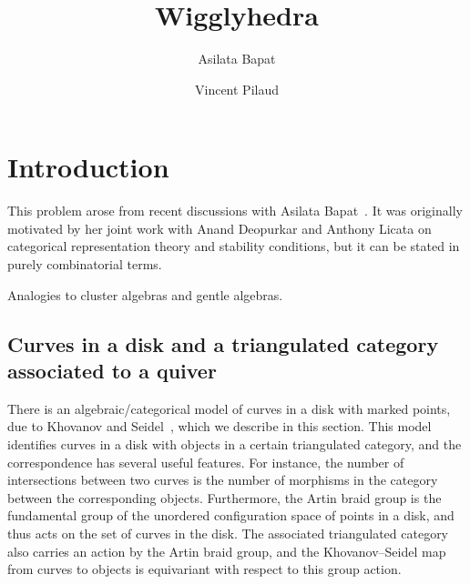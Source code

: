 \documentclass{amsart}
\title{Wigglyhedra}
\author{Asilata Bapat}
\author{Vincent Pilaud}
\theoremstyle{definition}
\begin{document}
\begin{abstract}
\end{abstract}

\maketitle

\tableofcontents


\section{Introduction}

This problem arose from recent discussions with Asilata Bapat~\cite{BapatPilaud}.
It was originally motivated by her joint work with Anand Deopurkar and Anthony Licata on categorical representation theory and stability conditions, but it can be stated in purely combinatorial terms.

Analogies to cluster algebras and gentle algebras.

\subsection{Curves in a disk and a triangulated category associated to a quiver}
There is an algebraic/categorical model of curves in a disk with marked points, due to Khovanov and Seidel~\cite{kho.sei:02}, which we describe in this section.
This model identifies curves in a disk with objects in a certain triangulated category, and the correspondence has several useful features.
For instance, the number of intersections between two curves is the number of morphisms in the category between the corresponding objects.
Furthermore, the Artin braid group is the fundamental group of the unordered configuration space of points in a disk, and thus acts on the set of curves in the disk.
The associated triangulated category also carries an action by the Artin braid group, and the Khovanov--Seidel map from curves to objects is equivariant with respect to this group action.
\end{document}
